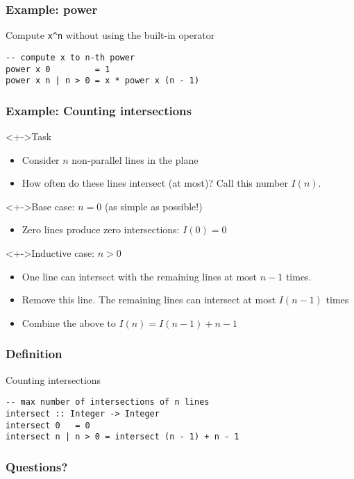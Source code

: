 \documentclass{beamer}
\begin{document}
\begin{frame}[fragile]
  \frametitle{Example: power}
  Compute \verb|x^n| without using the built-in operator
\begin{verbatim}
-- compute x to n-th power
power x 0         = 1
power x n | n > 0 = x * power x (n - 1)
\end{verbatim}
\end{frame}

\begin{frame}
  \frametitle{Example: Counting intersections}
  \begin{block}<+->{Task}
    \begin{itemize}
    \item Consider $n$ non-parallel lines in the plane
    \item How often do these lines intersect (at most)? Call this
      number $I (n)$.
    \end{itemize}
  \end{block}
  \begin{block}<+->{Base case: $n=0$ (as simple as possible!)}
    \begin{itemize}
    \item<+-> Zero lines produce zero intersections: $I(0) = 0$
    \end{itemize}
  \end{block}
  \begin{block}<+->{Inductive case: $n>0$}
    \begin{itemize}
    \item<+-> One line can intersect with the remaining
      lines at most $n-1$ times.
    \item<+-> Remove this line. The remaining lines can intersect at
      most $I (n-1)$ times
    \item<+-> Combine the above to $I (n) =  I (n-1) + n-1$
    \end{itemize}
  \end{block}
\end{frame}
\begin{frame}[fragile]
  \frametitle{Definition}
  \begin{block}{Counting intersections}
\begin{verbatim}
-- max number of intersections of n lines
intersect :: Integer -> Integer
intersect 0   = 0
intersect n | n > 0 = intersect (n - 1) + n - 1
\end{verbatim}
  \end{block}
\end{frame}

\begin{frame}
  \frametitle{Questions?}
  \begin{center}
  \end{center}
\end{frame}
\end{document}
